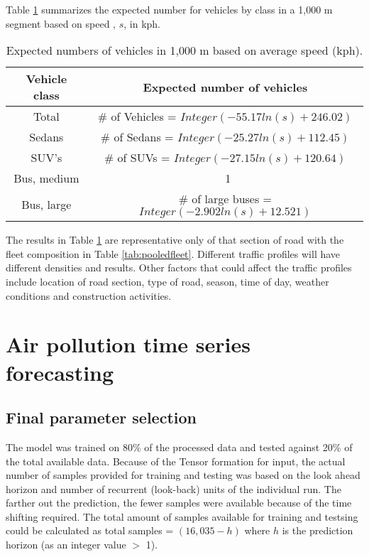 Table \ref{tb4:expectedvehicles} summarizes the expected number for vehicles by class in a 1,000 m segment based on speed , $s$, in kph.
%
\begin{table}[!htb]
\centering
\caption{ Expected numbers of vehicles in 1,000 m based on average speed (kph).}
\label{tb4:expectedvehicles}
\begin{tabular}{@{}cc@{}}
\toprule
\textbf{Vehicle class} & \textbf{Expected number of vehicles } \\ \midrule
Total & \# of Vehicles = $Integer(-55.17ln(s) + 246.02)$ \\
Sedans & \# of Sedans = $Integer (-25.27ln(s) + 112.45)$ \\
SUV's & \# of SUVs = $Integer (-27.15ln(s) + 120.64)$ \\
Bus, medium & \ 1 \\
Bus, large & \# of large buses = $Integer (-2.902ln(s) + 12.521)$ \\ \bottomrule
\end{tabular}
\end{table}
%
The results in Table \ref{tb4:expectedvehicles} are representative only of that section of road with the fleet composition in Table \ref{tab:pooledfleet}.  Different traffic profiles will have different densities and results.  Other factors that could affect the traffic profiles include location of road section, type of road, season, time of day, weather conditions and construction activities. 

\clearpage
\section{Air pollution time series forecasting}

\subsection{Final parameter selection}
The model was trained on 80\% of the processed data and tested against 20\% of the total available data. Because of the Tensor formation for input, the actual number of samples provided for training and testing was based on the look ahead horizon and number of recurrent (look-back) units of the individual run. The farther out the prediction, the fewer samples were available because of the time shifting required. The total amount of samples available for training and testsing could be calculated as total samples = $(16,035 - h)$ where $h$ is the prediction horizon (as an integer value $>$ 1). 

